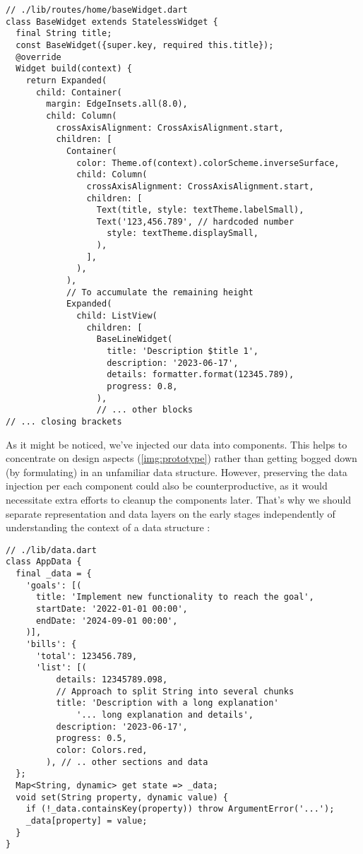 \begin{lstlisting}
// ./lib/routes/home/baseWidget.dart
class BaseWidget extends StatelessWidget {
  final String title;
  const BaseWidget({super.key, required this.title});
  @override
  Widget build(context) {
    return Expanded(
      child: Container(
        margin: EdgeInsets.all(8.0),
        child: Column(
          crossAxisAlignment: CrossAxisAlignment.start,
          children: [
            Container(
              color: Theme.of(context).colorScheme.inverseSurface,
              child: Column(
                crossAxisAlignment: CrossAxisAlignment.start,
                children: [
                  Text(title, style: textTheme.labelSmall),
                  Text('123,456.789', // hardcoded number
                    style: textTheme.displaySmall,
                  ),
                ],
              ),
            ),
            // To accumulate the remaining height
            Expanded( 
              child: ListView(
                children: [
                  BaseLineWidget(
                    title: 'Description $title 1',
                    description: '2023-06-17',
                    details: formatter.format(12345.789),
                    progress: 0.8,
                  ),
                  // ... other blocks
// ... closing brackets
\end{lstlisting}

\noindent As it might be noticed, we've injected our data into components. This helps to concentrate on design 
aspects (\cref{img:prototype}) rather than getting bogged down (by formulating) in an unfamiliar data structure. 
However, preserving the data injection per each component could also be counterproductive, as it would necessitate 
extra efforts to cleanup the components later. That's why we should separate representation and data layers on the 
early stages independently of understanding the context of a data structure :

\begin{lstlisting}[caption=Mock Structure of a Financial Data, label=code:app-data]
// ./lib/data.dart
class AppData {
  final _data = {
    'goals': [(
      title: 'Implement new functionality to reach the goal',
      startDate: '2022-01-01 00:00',
      endDate: '2024-09-01 00:00',
    )],
    'bills': {
      'total': 123456.789,
      'list': [(
          details: 12345789.098,
          // Approach to split String into several chunks
          title: 'Description with a long explanation'
              '... long explanation and details',
          description: '2023-06-17',
          progress: 0.5,
          color: Colors.red,
        ), // .. other sections and data
  };
  Map<String, dynamic> get state => _data;
  void set(String property, dynamic value) {
    if (!_data.containsKey(property)) throw ArgumentError('...');
    _data[property] = value;
  }
}
\end{lstlisting}

